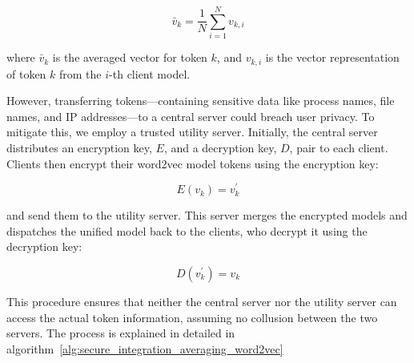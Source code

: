 \[
\bar{v}_k = \frac{1}{N} \sum_{i=1}^{N} v_{k,i}
\]

where \(\bar{v}_k\) is the averaged vector for token \(k\), and \(v_{k,i}\) is the vector representation of token \(k\) from the \(i\)-th client model.

However, transferring tokens—containing sensitive data like process names, file names, and IP addresses—to a central server could breach user privacy. To mitigate this, we employ a trusted utility server. Initially, the central server distributes an encryption key, \(E\), and a decryption key, \(D\), pair to each client. Clients then encrypt their word2vec model tokens using the encryption key:

\[
E(v_{k}) = v_{k}^{'}
\]

and send them to the utility server. This server merges the encrypted models and dispatches the unified model back to the clients, who decrypt it using the decryption key:

\[
D(v_{k}^{'}) = v_{k}
\]

This procedure ensures that neither the central server nor the utility server can access the actual token information, assuming no collusion between the two servers. The process is explained in detailed in algorithm~\ref{alg:secure_integration_averaging_word2vec}

